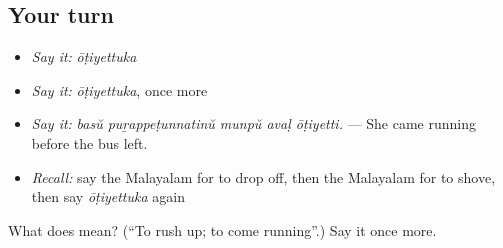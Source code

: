 \subsection*{Your turn}
\begin{itemize}
\raggedright
  \item \emph{Say it:} \emph{ōṭiyettuka}
  \item \emph{Say it:} \emph{ōṭiyettuka}, once more
  \item \emph{Say it:} \emph{basŭ puṟappeṭunnatinŭ munpŭ avaḷ ōṭiyetti.} — She came running before the bus left.
  \item \emph{Recall:} say the Malayalam for to drop off, then the Malayalam for to shove, then say \emph{ōṭiyettuka} again
\end{itemize}

\begin{tcolorbox}[breakable,colback=teal!4,colframe=teal!35!black,title={Before you move on}]
What does  mean? (\textquotedblleft{}To rush up; to come running\textquotedblright{}.) Say it once more.
\end{tcolorbox}
